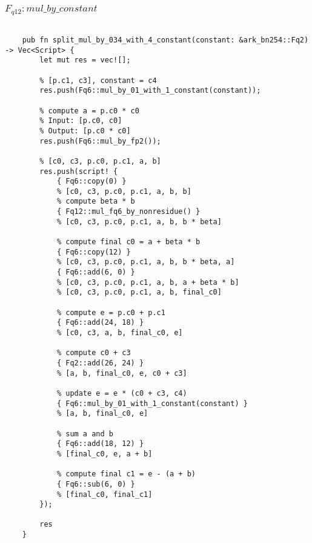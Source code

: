\subsubsection{$F_{q12}: mul\_by\_constant$}

\begin{lstlisting}

    pub fn split_mul_by_034_with_4_constant(constant: &ark_bn254::Fq2) -> Vec<Script> {
        let mut res = vec![];

        % [p.c1, c3], constant = c4
        res.push(Fq6::mul_by_01_with_1_constant(constant));

        % compute a = p.c0 * c0
        % Input: [p.c0, c0]
        % Output: [p.c0 * c0]
        res.push(Fq6::mul_by_fp2());

        % [c0, c3, p.c0, p.c1, a, b]
        res.push(script! {
            { Fq6::copy(0) }
            % [c0, c3, p.c0, p.c1, a, b, b]
            % compute beta * b
            { Fq12::mul_fq6_by_nonresidue() }
            % [c0, c3, p.c0, p.c1, a, b, b * beta]

            % compute final c0 = a + beta * b
            { Fq6::copy(12) }
            % [c0, c3, p.c0, p.c1, a, b, b * beta, a]
            { Fq6::add(6, 0) }
            % [c0, c3, p.c0, p.c1, a, b, a + beta * b]
            % [c0, c3, p.c0, p.c1, a, b, final_c0]

            % compute e = p.c0 + p.c1
            { Fq6::add(24, 18) }
            % [c0, c3, a, b, final_c0, e]

            % compute c0 + c3
            { Fq2::add(26, 24) }
            % [a, b, final_c0, e, c0 + c3]

            % update e = e * (c0 + c3, c4)
            { Fq6::mul_by_01_with_1_constant(constant) }
            % [a, b, final_c0, e]

            % sum a and b
            { Fq6::add(18, 12) }
            % [final_c0, e, a + b]

            % compute final c1 = e - (a + b)
            { Fq6::sub(6, 0) }
            % [final_c0, final_c1]
        });

        res
    }

\end{lstlisting}